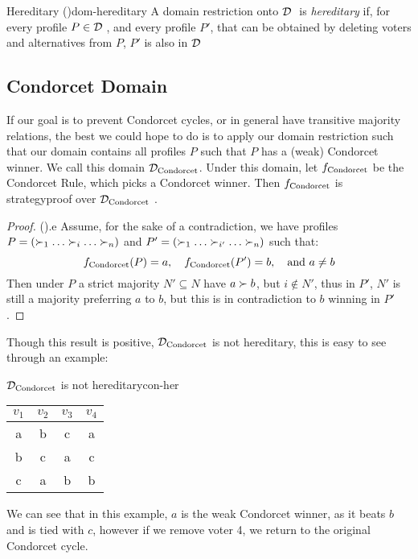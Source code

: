 \begin{definition}{Hereditary \textnormal{(\citet{elkindPreferenceRestrictionsComputational2022a})}}{dom-hereditary}
	A domain restriction onto $\mathcal{D}_{\text{ }}$ is \textit{hereditary} if, for every profile $P \in \mathcal{D}_{\text{ }}$, and every profile $P'$, that can be obtained by deleting voters and alternatives from $P$, $P'$ is also in $\mathcal{D}_{\text{ }}$
\end{definition}

\subsection{Condorcet Domain}
If our goal is to prevent Condorcet cycles, or in general have transitive majority relations, the best we could hope to do is to apply our domain restriction such that our domain contains all profiles $P$ such that $P$ has a (weak) Condorcet winner. We call this domain $\mathcal{D}_{\text{Condorcet}}$. Under this domain, let $f_{\text{Condorcet}}$ be the Condorcet Rule, which picks a Condorcet winner. Then $f_{\text{Condorcet}}$ is strategyproof over $\mathcal{D}_{\text{Condorcet}}$ \citep{elkindPreferenceRestrictionsComputational2022a}.

\begin{proof}{(\citet{elkindPreferenceRestrictionsComputational2022a}).}e
	Assume, for the sake of a contradiction, we have profiles $P = (\pref_1 \dots \pref_i \dots \pref_n)$ and $P' = (\pref_1 \dots \pref_{i'} \dots \pref_n)$ such that:
	\[
		f_{\text{Condorcet}}(P) = a, \quad f_{\text{Condorcet}}(P') = b, \quad \text{and } a \neq b
	\]
	Then under $P$ a strict majority $N' \subseteq N$ have $a \succ b$, but $i \notin N'$, thus in $P'$, $N'$ is still a majority preferring $a$ to $b$, but this is in contradiction to $b$ winning in $P'$.
\end{proof}


Though this result is positive, $\mathcal{D}_{\text{Condorcet}}$ is not hereditary, this is easy to see through an example:
\begin{example}{$\mathcal{D}_{\text{Condorcet}}$ is not hereditary}{con-her}
	\begin{minipage}{0.25\linewidth}
		\begin{tabular}{cccc}
			\toprule
			$v_1$ & $v_2$ & $v_3$ & $v_4$ \\
			\midrule
			a     & b     & c     & a     \\
			b     & c     & a     & c     \\
			c     & a     & b     & b     \\
			\bottomrule
		\end{tabular}
	\end{minipage}
	\begin{minipage}[b]{0.70\linewidth}
		We can see that in this example, $a$ is the weak Condorcet winner, as it beats $b$ and is tied with $c$, however if we remove voter 4, we return to the original Condorcet cycle.
	\end{minipage}
\end{example}

